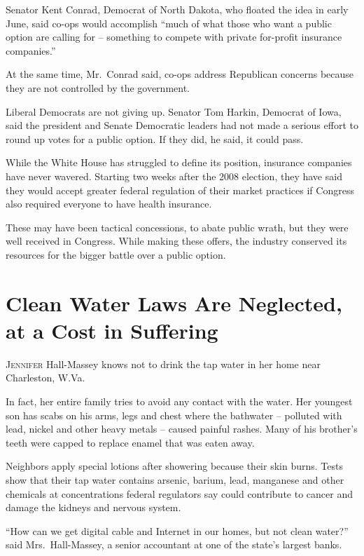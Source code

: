 ﻿\documentclass[12pt]{article}
\begin{document}
Senator Kent Conrad, Democrat of North Dakota, who floated the idea in early June, said co-ops would
accomplish ``much of what those who want a public option are calling for -- something to compete
with private for-profit insurance companies.''

At the same time, Mr.~Conrad said, co-ops address Republican concerns because they are not
controlled by the government.

Liberal Democrats are not giving up. Senator Tom Harkin, Democrat of Iowa, said the president and
Senate Democratic leaders had not made a serious effort to round up votes for a public option. If
they did, he said, it could pass.

While the White House has struggled to define its position, insurance companies have never wavered.
Starting two weeks after the 2008 election, they have said they would accept greater federal
regulation of their market practices if Congress also required everyone to have health insurance.

These may have been tactical concessions, to abate public wrath, but they were well received in
Congress. While making these offers, the industry conserved its resources for the bigger battle over
a public option.

\section{Clean Water Laws Are Neglected, at a Cost in Suffering}

\lettrine{J}{ennifer} Hall-Massey knows not to drink the tap water in her home near Charleston,
W.Va.

In fact, her entire family tries to avoid any contact with the water. Her youngest son has scabs on
his arms, legs and chest where the bathwater -- polluted with lead, nickel and other heavy metals --
caused painful rashes. Many of his brother's teeth were capped to replace enamel that was eaten
away.

Neighbors apply special lotions\cite{lotion} after showering because their skin burns. Tests show
that their tap water contains arsenic\cite{arsenic}, barium\cite{barium}, lead,
manganese\cite{manganese} and other chemicals at concentrations federal regulators say could
contribute to cancer and damage the kidneys and nervous system.

``How can we get digital cable and Internet in our homes, but not clean water?'' said
Mrs.~Hall-Massey, a senior accountant at one of the state's largest banks.
\end{document}
